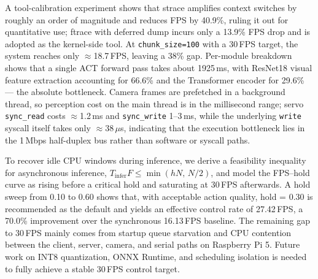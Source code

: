 \documentclass[12pt, a4paper, fontset=macnew]{ctexart}
\begin{document}
A tool-calibration experiment shows that strace amplifies context switches by roughly an order of
magnitude and reduces FPS by 40.9\%, ruling it out for quantitative use; ftrace with deferred dump
incurs only a 13.9\% FPS drop and is adopted as the kernel-side tool. At \texttt{chunk\_size=100} with
a 30\,FPS target, the system reaches only $\approx$18.7\,FPS, leaving a 38\% gap. Per-module breakdown
shows that a single ACT forward pass takes about 1925\,ms, with ResNet18 visual feature extraction
accounting for 66.6\% and the Transformer encoder for 29.6\% --- the absolute bottleneck.
Camera frames are prefetched in a background thread, so perception cost on the main thread is in the
millisecond range; servo \texttt{sync\_read} costs $\approx$1.2\,ms and \texttt{sync\_write} 1--3\,ms,
while the underlying \texttt{write} syscall itself takes only $\approx$38\,$\mu$s, indicating that the
execution bottleneck lies in the 1\,Mbps half-duplex bus rather than software or syscall paths.

To recover idle CPU windows during inference, we derive a feasibility inequality for asynchronous
inference, $T_{\text{infer}}F \leq \min(hN,\,N/2)$, and model the FPS--hold curve as rising before
a critical hold and saturating at 30\,FPS afterwards. A hold sweep from 0.10 to 0.60 shows that,
with acceptable action quality, hold = 0.30 is recommended as the default and yields an effective
control rate of 27.42\,FPS, a 70.0\% improvement over the synchronous 16.13\,FPS baseline. The
remaining gap to 30\,FPS mainly comes from startup queue starvation and CPU contention between
the client, server, camera, and serial paths on Raspberry Pi 5. Future work on INT8 quantization,
ONNX Runtime, and scheduling isolation is needed to fully achieve a stable 30\,FPS control target.

\vspace{1.5em}

\clearpage

\tableofcontents
\clearpage

\mbox{}
\thispagestyle{empty}
\clearpage

\setcounter{page}{1}
\pagestyle{mainmatter}
\end{document}

